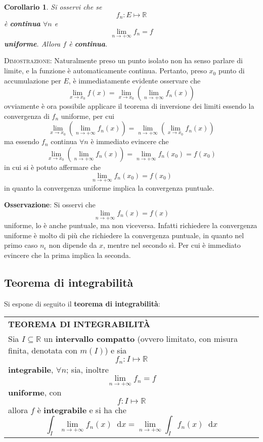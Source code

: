 \documentclass[a4paper]{extarticle}
\newtheorem{corollary}{Corollario}[theorem]
\renewcommand\arraystretch{}
\newcommand*\dif{\mathop{}\!\mathrm{d}}
\begin{document}
\vspace{1em}
\begin{corollary}
    Si osservi che se
    \[f_n : E \longmapsto \mathbb{R}\]
    è \textbf{continua} $\forall n$ e 
    \[\lim_{n\to +\infty} f_n = f\]
    \textbf{uniforme}. Allora $f$ è \textbf{continua}.
\end{corollary}

\vspace{2em}
\noindent
\normalfont \normalsize
\textsc{Dimostrazione}: Naturalmente preso un punto isolato non ha senso parlare di limite, e la funzione è automaticamente continua. Pertanto, preso $x_0$ punto di accumulazione per $E$, è immediatamente evidente osservare che
\[\lim_{x \to x_0} f(x) = \lim_{x \to x_0} \left(\lim_{n \to +\infty} f_n(x)\right)\]
ovviamente è ora possibile applicare il teorema di inversione dei limiti essendo la convergenza di $f_n$ uniforme, per cui
\[\lim_{x \to x_0} \left(\lim_{n \to +\infty} f_n(x)\right) = \lim_{n \to +\infty} \left(\lim_{x \to x_0} f_n(x)\right)\]
ma essendo $f_n$ continua $\forall n$ è immediato evincere che
\[\lim_{x \to x_0} \left(\lim_{n \to +\infty} f_n(x)\right)= \lim_{n \to +\infty} f_n(x_0) = f(x_0)\]
in cui si è potuto affermare che
\[\lim_{n \to +\infty} f_n(x_0) = f(x_0)\]
in quanto la convergenza uniforme implica la convergenza puntuale.

\vspace{2em}
\noindent
\textbf{Osservazione}: Si osservi che
\[\lim_{n \to +\infty} f_n(x) = f(x)\]
uniforme, lo è anche puntuale, ma non viceversa. Infatti richiedere la convergenza uniforme è molto di più che richiedere la convergenza puntuale, in quanto nel primo caso $n_\epsilon$ non dipende da $x$, mentre nel secondo sì. Per cui è immediato evincere che la prima implica la seconda.

\vspace{2em}
\noindent
\subsection{Teorema di integrabilità}
Si espone di seguito il \textbf{teorema di integrabilità}:

\vspace{1em}
\setlength{\tabcolsep}{14pt}
\renewcommand{\arraystretch}{2}
\noindent
\begin{tabularx}{\textwidth}{@{}|P|@{}}
    \hline
    {\textbf{TEOREMA DI INTEGRABILITÀ}}\\
    \parbox{\linewidth}{
        Sia $I \subseteq \mathbb{R}$ un \textbf{intervallo compatto} (ovvero limitato, con misura finita, denotata con $m(I)$) e sia 
        \[f_n : I \longmapsto \mathbb{R}\]
        \textbf{integrabile}, $\forall n$; sia, inoltre
        \[\lim_{n \to +\infty} f_n = f\]
        \textbf{uniforme}, con
        \[f : I \longmapsto \mathbb{R}\]
        allora $f$ è \textbf{integrabile} e si ha che
        \[\int_I \lim_{n \to +\infty} f_n(x) \dif x = \lim_{n \to +\infty} \int_I f_n(x) \dif x\]
        \vspace{-1mm}}\\
    \hline
\end{tabularx}
\end{document}
